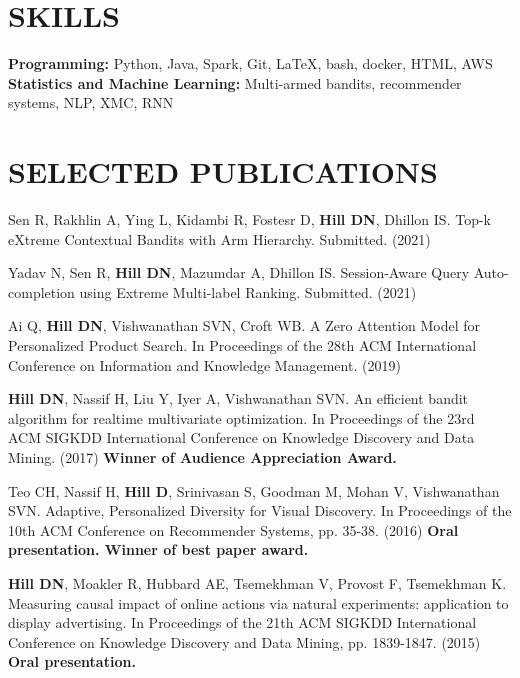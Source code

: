 \documentclass[line,10pt]{res}
\begin{document}
\begin{resume}
\section{SKILLS} 
{\bf Programming:} {\small Python, Java, Spark, Git, \LaTeX, bash, docker, HTML, AWS} \\
{\bf Statistics and Machine Learning: } {\small Multi-armed bandits, recommender systems, NLP, XMC, RNN}
    
\section{SELECTED PUBLICATIONS} 

Sen R, Rakhlin A, Ying L, Kidambi R, Fostesr D, \textbf{Hill DN}, Dhillon IS. Top-k eXtreme Contextual Bandits with Arm Hierarchy. Submitted. (2021)

Yadav N, Sen R, \textbf{Hill DN}, Mazumdar A, Dhillon IS. Session-Aware Query Auto-completion using Extreme Multi-label Ranking. Submitted. (2021)

Ai Q, \textbf{Hill DN}, Vishwanathan SVN, Croft WB. A Zero Attention Model for Personalized Product Search. In Proceedings of the 28th ACM International Conference on Information and Knowledge Management. (2019)

\textbf{Hill DN}, Nassif H, Liu Y, Iyer A, Vishwanathan SVN. An efficient bandit algorithm for realtime multivariate optimization. In Proceedings of the 23rd ACM SIGKDD International Conference on Knowledge Discovery and Data Mining. (2017) \textbf{Winner of Audience Appreciation Award.}

Teo CH, Nassif H, \textbf{Hill D}, Srinivasan S, Goodman M, Mohan V, Vishwanathan SVN. Adaptive, Personalized Diversity for Visual Discovery. In Proceedings of the 10th ACM Conference on Recommender Systems, pp. 35-38. (2016) \textbf{Oral presentation. Winner of best paper award.}

\textbf{Hill DN}, Moakler R, Hubbard AE, Tsemekhman V, Provost F, Tsemekhman K.  Measuring causal impact of online actions via natural experiments: application to display advertising. In Proceedings of the 21th ACM SIGKDD International Conference on Knowledge Discovery and Data Mining, pp. 1839-1847. (2015) \textbf{Oral presentation.}

\end{resume}
\end{document}

